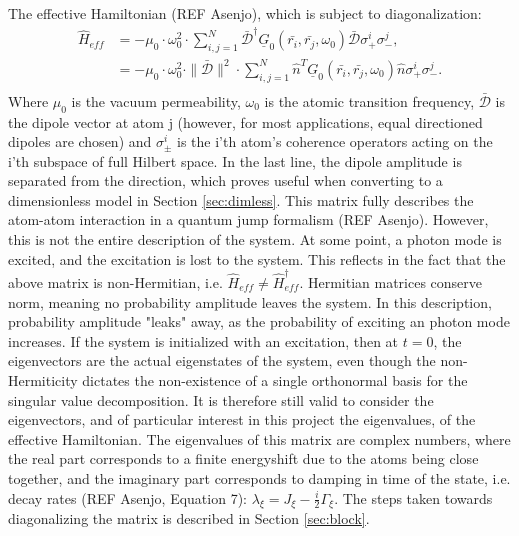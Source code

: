 \documentclass{article}
\begin{document}
The effective Hamiltonian (REF Asenjo), which is subject to diagonalization:
\begin{equation}\label{eq:Heff}
    \begin{split}
        \hat{H}_{eff} &= - \mu_0 \cdot \omega_0^2 \cdot \sum_{i,j = 1}^N \bar{\mathscr{D}}^\dagger \underline{G}_0(\bar{r_i}, \bar{r_j}, \omega_0) \bar{\mathscr{D}} \sigma_+^i \sigma_-^j, \\
        &=- \mu_0 \cdot \omega_0^2 \cdot \|\bar{\mathscr{D}}\|^2 \cdot \sum_{i,j = 1}^N \hat{n}^T \underline{G}_0(\bar{r_i}, \bar{r_j}, \omega_0) \hat{n} \sigma_+^i \sigma_-^j. \\
    \end{split}
\end{equation}
Where $\mu_0$ is the vacuum permeability, $\omega_0$ is the atomic transition frequency, $\bar{\mathscr{D}}$ is the dipole vector at atom j (however, for most applications, equal directioned dipoles are chosen) and $\sigma_\pm^i$ is the i'th atom's coherence operators acting on the i'th subspace of full Hilbert space. In the last line, the dipole amplitude is separated from the direction, which proves useful when converting to a dimensionless model in Section \ref{sec:dimless}. This matrix fully describes the atom-atom interaction in a quantum jump formalism (REF Asenjo). However, this is not the entire description of the system. At some point, a photon mode is excited, and the excitation is lost to the system. This reflects in the fact that the above matrix is non-Hermitian, i.e. $\hat{H}_{eff} \neq \hat{H}_{eff}^\dagger$. Hermitian matrices conserve norm, meaning no probability amplitude leaves the system. In this description, probability amplitude "leaks" away, as the probability of exciting an photon mode increases. If the system is initialized with an excitation, then at $t=0$, the eigenvectors are the actual eigenstates of the system, even though the non-Hermiticity dictates the non-existence of a single orthonormal basis for the singular value decomposition. It is therefore still valid to consider the eigenvectors, and of particular interest in this project the eigenvalues, of the effective Hamiltonian. The eigenvalues of this matrix are complex numbers, where the real part corresponds to a finite energyshift due to the atoms being close together, and the imaginary part corresponds to damping in time of the state, i.e. decay rates (REF Asenjo, Equation 7): $\lambda_\xi = J_\xi - \frac{i}{2} \Gamma_\xi$. The steps taken towards diagonalizing the matrix is described in Section \ref{sec:block}. 
\end{document}

